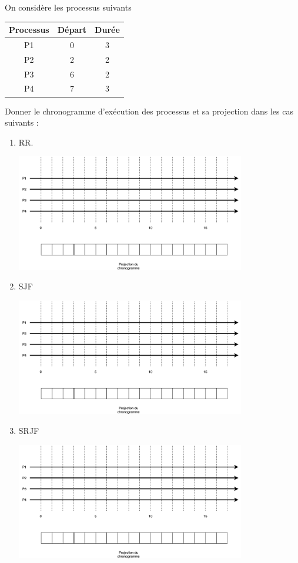 \documentclass[12pt,a4paper,article,english,firamath]{nsi}
\begin{document}
On considère les processus suivants
\begin{center}
\begin{tabular}{|c|c|c|}
\hline\rowcolor{UGLiOrange}
\textbf{\color{white} Processus} & \textbf{\color{white}Départ} & \textbf{\color{white}Durée} \\
\hline
P1 & 0 & 3 \\
\hline
P2 & 2 & 2 \\
\hline
P3 & 6 & 2 \\
\hline
P4 & 7 & 3 \\
\hline
\end{tabular}
\end{center}
Donner le chronogramme d'exécution des processus et sa projection dans les cas suivants :
\begin{enumerate}
	\item 	RR.
    \begin{center}
                     \includegraphics[width=10cm]{img/mc}\\
                     \end{center}
    \newpage
    
	\item 	SJF
    \begin{center}
                     \includegraphics[width=10cm]{img/mc}\\
                     \end{center}
    \item SRJF
    \begin{center}
                     \includegraphics[width=10cm]{img/mc}\\
                     \end{center}
    \end{enumerate}
\end{document}
